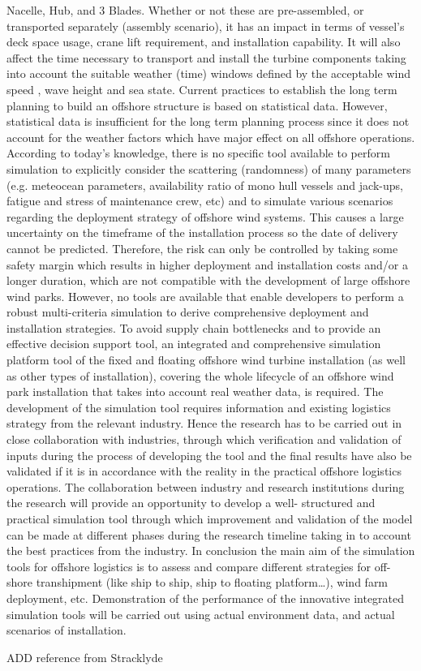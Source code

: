 Nacelle, Hub, and 3 Blades. Whether or not these are pre-assembled, or transported separately (assembly scenario), it has an impact in terms of
vessel's deck space usage, crane lift requirement, and installation capability. It will also affect the time necessary to transport and install the
turbine components taking into account the suitable weather (time) windows defined by the acceptable wind speed , wave height and sea state.
Current practices to establish the long term planning to build an offshore structure is based on statistical data. However, statistical data is
insufficient for the long term planning process since it does not account for the weather factors which have major effect on all offshore
operations. According to today’s knowledge, there is no specific tool available to perform simulation to explicitly consider the scattering
(randomness) of many parameters (e.g. meteocean parameters, availability ratio of mono hull vessels and jack-ups, fatigue and stress of
maintenance crew, etc) and to simulate various scenarios regarding the deployment strategy of offshore wind systems. This causes a large
uncertainty on the timeframe of the installation process so the date of delivery cannot be predicted. Therefore, the risk can only be controlled by
taking some safety margin which results in higher deployment and installation costs and/or a longer duration, which are not compatible with the
development of large offshore wind parks. However, no tools are available that enable developers to perform a robust multi-criteria simulation to
derive comprehensive deployment and installation strategies.
To avoid supply chain bottlenecks and to provide an effective decision support tool, an integrated and comprehensive simulation platform tool
of the fixed and floating offshore wind turbine installation (as well as other types of installation), covering the whole lifecycle of an offshore wind
park installation that takes into account real weather data, is required.
The development of the simulation tool requires information and existing logistics strategy from the relevant industry. Hence the research has to
be carried out in close collaboration with industries, through which verification and validation of inputs during the process of developing the tool
and the final results have also be validated if it is in accordance with the reality in the practical offshore logistics operations. The collaboration
between industry and research institutions during the research will provide an opportunity to develop a well- structured and practical simulation
tool through which improvement and validation of the model can be made at different phases during the research timeline taking in to account
the best practices from the industry.
In conclusion the main aim of the simulation tools for offshore logistics is to assess and compare different strategies for off-shore transhipment
(like ship to ship, ship to floating platform…), wind farm deployment, etc. Demonstration of the performance of the innovative integrated
simulation tools will be carried out using actual environment data, and actual scenarios of installation.

ADD reference from Stracklyde